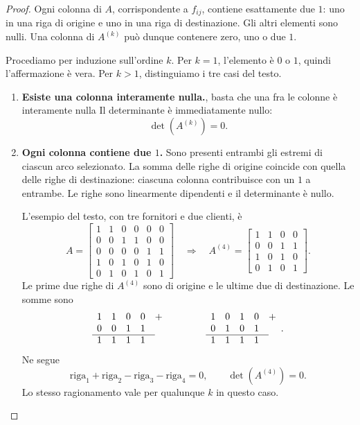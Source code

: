 \begin{proof}
Ogni colonna di \(A\), corrispondente a \(f_{ij}\), contiene
esattamente due \(1\): uno in una riga di origine e uno
in una riga di destinazione. Gli altri elementi sono nulli.
Una colonna di \(A^{(k)}\) può dunque contenere zero, uno o due \(1\).

Procediamo per induzione sull'ordine \(k\). Per \(k=1\), l'elemento
è \(0\) o \(1\), quindi l'affermazione è vera.
Per \(k>1\), distinguiamo i tre casi del testo.
\begin{enumerate}
\item \textbf{Esiste una colonna interamente nulla.}, basta che una fra le colonne è interamente nulla
Il determinante è immediatamente nullo:
\[
\det\!\left(A^{(k)}\right)=0.
\]

\item \textbf{Ogni colonna contiene due \(1\).}
Sono presenti entrambi gli estremi di ciascun arco selezionato.
La somma delle righe di origine coincide con quella
delle righe di destinazione: ciascuna colonna contribuisce
con un \(1\) a entrambe. Le righe sono linearmente dipendenti
e il determinante è nullo.

L'esempio del testo, con tre fornitori e due clienti, è
\[
A=
\begin{bmatrix}
1&1&0&0&0&0\\
0&0&1&1&0&0\\
0&0&0&0&1&1\\
1&0&1&0&1&0\\
0&1&0&1&0&1
\end{bmatrix}
\quad\Longrightarrow\quad
A^{(4)}=
\begin{bmatrix}
1&1&0&0\\
0&0&1&1\\
1&0&1&0\\
0&1&0&1
\end{bmatrix}.
\]
Le prime due righe di \(A^{(4)}\) sono di origine e le ultime
due di destinazione. Le somme sono
\[
\begin{array}{rrrr@{\quad}c}
1&1&0&0&+\\
0&0&1&1&\\ \cline{1-4}
1&1&1&1&
\end{array}
\qquad\qquad
\begin{array}{rrrr@{\quad}c}
1&0&1&0&+\\
0&1&0&1&\\ \cline{1-4}
1&1&1&1&
\end{array}.
\]
Ne segue
\[
\text{riga}_1+\text{riga}_2-\text{riga}_3-\text{riga}_4=0,
\qquad \det\!\left(A^{(4)}\right)=0.
\]
Lo stesso ragionamento vale per qualunque \(k\) in questo caso.


\end{enumerate}
\end{proof}

